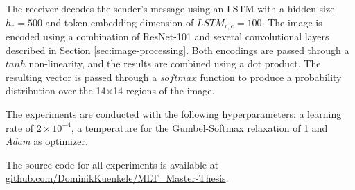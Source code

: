 \documentclass[11pt,a4paper]{article}
\begin{document}
The receiver decodes the sender's message using an LSTM with a hidden size $h_r=500$ and token embedding dimension of $LSTM_{r,e}=100$.
The image is encoded using a combination of ResNet-101 and several convolutional layers described in Section \ref{sec:image-processing}.
Both encodings are passed through a $tanh$ non-linearity, and the results are combined using a dot product.
The resulting vector is passed through a $softmax$ function to produce a probability distribution over the 14$\times$14 regions of the image.

The experiments are conducted with the following hyperparameters: a learning rate of $2\times10^{-4}$, a temperature for the Gumbel-Softmax relaxation of 1 and \emph{Adam} \citep{Kingma2015} as optimizer.

The source code for all experiments is available at \href{https://github.com/DominikKuenkele/MLT\_Master-Thesis}{github.com/DominikKuenkele/MLT\_Master-Thesis}.
\end{document}
